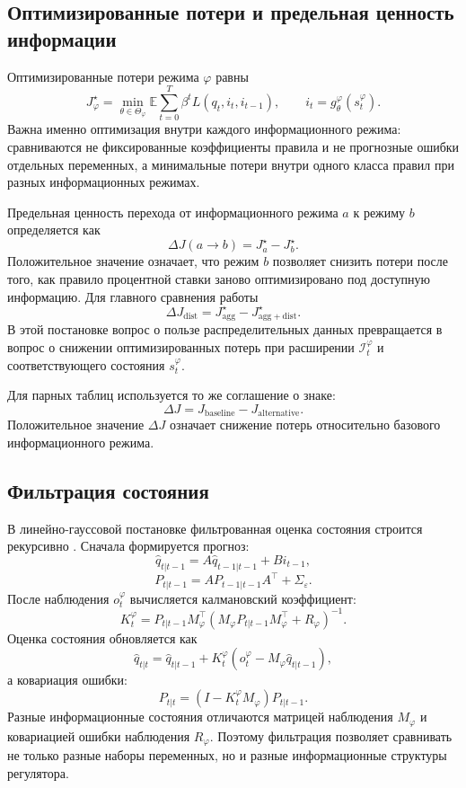 \subsection{Оптимизированные потери и предельная ценность информации}

Оптимизированные потери режима \(\varphi\) равны
\[
J_\varphi^\star
=
\min_{\theta\in\Theta_\varphi}
\mathbb E
\sum_{t=0}^{T}
\beta^t
L(q_t,i_t,i_{t-1}),
\qquad
i_t=g_\theta^\varphi(s_t^\varphi).
\]
Важна именно оптимизация внутри каждого информационного режима: сравниваются не фиксированные
коэффициенты правила и не прогнозные ошибки отдельных переменных, а минимальные потери внутри
одного класса правил при разных информационных режимах.

Предельная ценность перехода от информационного режима \(a\) к режиму \(b\) определяется как
\[
\Delta J(a \to b)
=
J_a^\star-J_b^\star .
\]
Положительное значение означает, что режим \(b\) позволяет снизить потери после того, как
правило процентной ставки заново оптимизировано под доступную информацию. Для главного сравнения работы
\[
\Delta J_{\mathrm{dist}}
=
J^\star_{\mathrm{agg}}
-
J^\star_{\mathrm{agg+dist}} .
\]
В этой постановке вопрос о пользе распределительных данных превращается в вопрос о снижении
оптимизированных потерь при расширении \(\mathcal I_t^\varphi\) и соответствующего состояния
\(s_t^\varphi\).

Для парных таблиц используется то же соглашение о знаке:
\[
\Delta J
=
J_{\mathrm{baseline}}-J_{\mathrm{alternative}}.
\]
Положительное значение \(\Delta J\) означает снижение потерь относительно базового информационного
режима.

\subsection{Фильтрация состояния}

В линейно-гауссовой постановке фильтрованная оценка состояния строится рекурсивно
\cite{kalman1960filtering}. Сначала
формируется прогноз:
\[
\widehat{q}_{t|t-1}
=
A\widehat{q}_{t-1|t-1}+B i_{t-1},
\]
\[
P_{t|t-1}
=
A P_{t-1|t-1}A^\top+\Sigma_\varepsilon .
\]
После наблюдения \(o_t^\varphi\) вычисляется калмановский коэффициент:
\[
K_t^\varphi
=
P_{t|t-1}M_\varphi^\top
\left(
M_\varphi P_{t|t-1}M_\varphi^\top+R_\varphi
\right)^{-1}.
\]
Оценка состояния обновляется как
\[
\widehat{q}_{t|t}
=
\widehat{q}_{t|t-1}
+
K_t^\varphi
\left(
o_t^\varphi-M_\varphi\widehat{q}_{t|t-1}
\right),
\]
а ковариация ошибки:
\[
P_{t|t}
=
(I-K_t^\varphi M_\varphi)P_{t|t-1}.
\]
Разные информационные состояния отличаются матрицей наблюдения \(M_\varphi\) и ковариацией ошибки
наблюдения \(R_\varphi\). Поэтому фильтрация позволяет сравнивать не только разные наборы переменных,
но и разные информационные структуры регулятора.

